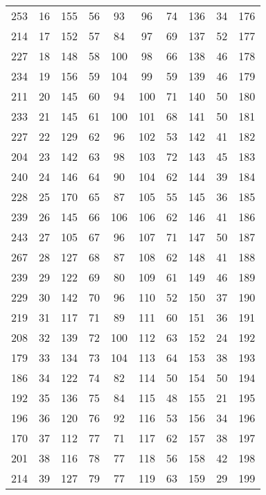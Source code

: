 \begin{table}
\begin{tabular}{c c || c c || c c || c c || c c}
253      &   16    &155      &   56&93      &    96  &74      &136 & 34     & 176  \\
214      &   17    &152      &   57&84      &    97  &69      &137 & 52     & 177  \\
227      &   18    &148      &   58&100     &    98  &66      &138 & 46     & 178  \\
234      &   19    &156      &   59&104     &    99  &59      &139 & 46     & 179  \\
211      &   20    &145      &   60&94      &    100 &71      &140 & 50     & 180  \\
233      &   21    &145      &   61&100     &    101 &68      &141 & 50     & 181  \\
227      &   22    &129      &   62&96      &    102 &53      &142 & 41     & 182  \\
204      &   23    &142      &   63&98      &    103 &72      &143 & 45     & 183  \\
240      &   24    &146      &   64&90      &    104 &62      &144 & 39     & 184  \\
228      &   25    &170      &   65&87      &    105 &55      &145 & 36     & 185  \\
239      &   26    &145      &   66&106     &    106 &62      &146 & 41     & 186  \\
243      &   27    &105      &   67&96      &    107 &71      &147 & 50     & 187  \\
267      &   28    &127      &   68&87      &    108 &62      &148 & 41     & 188  \\
239      &   29    &122      &   69&80      &    109 &61      &149 & 46     & 189  \\
229      &   30    &142      &   70&96      &    110 &52      &150 & 37     & 190  \\
219      &   31    &117      &   71&89      &    111 &60      &151 & 36     & 191  \\
208      &   32    &139      &   72&100     &    112 &63      &152 & 24     & 192  \\
179      &   33    &134      &   73&104     &    113 &64      &153 & 38     & 193  \\
186      &   34    &122      &   74&82      &    114 &50      &154 & 50     & 194  \\
192      &   35    &136      &   75&84      &    115 &48      &155 & 21     & 195  \\
196      &   36    &120      &   76&92      &    116 &53      &156 & 34     & 196  \\
170      &   37    &112      &   77&71      &    117 &62      &157 & 38     & 197  \\
201      &   38    &116      &   78&77      &    118 &56      &158 & 42     & 198  \\
214      &   39    &127      &   79&77      &    119 &63      &159 & 29    &  199 \\

    \end{tabular}
\end{table}
 


